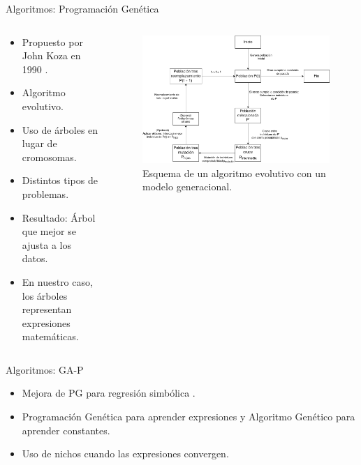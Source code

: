\documentclass{beamer}
\begin{document}
\begin{frame}{Algoritmos: Programación Genética}

	\begin{columns}[T]

		\begin{column}{.4\textwidth}
			\begin{itemize}
				\item Propuesto por John Koza en 1990 \cite{kozaGP}.
				\item Algoritmo evolutivo.
				\item Uso de árboles en lugar de cromosomas.
				\item Distintos tipos de problemas.
				\item Resultado: Árbol que mejor se ajusta a los datos.
				\item En nuestro caso, los árboles representan expresiones matemáticas.
			\end{itemize}
		\end{column}


		\begin{column}{.6\textwidth}
			\begin{figure}[H]
			    \centering
				 \includegraphics[width=\textwidth]{generacional.png}
			    \caption{Esquema de un algoritmo evolutivo con un modelo generacional.}
				 \label{fig:modelo_generacioal}
			\end{figure}
		\end{column}

	\end{columns}

\end{frame}

\begin{frame}{Algoritmos: GA-P}
	\begin{itemize}
		\item Mejora de PG para regresión simbólica \cite{primerGAP}.
		\item Programación Genética para aprender expresiones y Algoritmo Genético para aprender constantes.
		\item Uso de nichos cuando las expresiones convergen.
	\end{itemize}

\end{frame}
\end{document}
